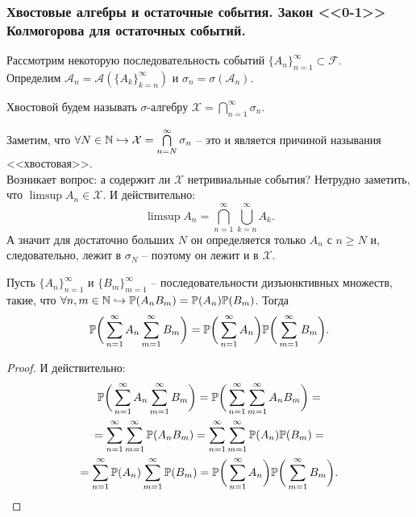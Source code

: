 \subsubsection{Хвостовые алгебры и остаточные события. Закон <<0-1>> Колмогорова для остаточных событий.}
Рассмотрим некоторую последовательность событий $\{A_n\}_{n = 1}^\infty \subset \mathcal{F}$. \\
Определим $\mathcal{A}_n = \mathcal{A}(\{A_k\}_{k = n}^\infty)$ и $\sigma_n = \sigma(\mathcal{A}_n)$. 
\begin{definition}
    Хвостовой будем называть $\sigma$-алгебру $\mathcal{X} = \bigcap\limits_{n = 1}^{\infty} \sigma_n$.    
\end{definition}
Заметим, что $\forall N \in \N \hookrightarrow \mathcal{X} = \bigcap\limits_{n = N}^\infty \sigma_n$ -- это и является причиной называния <<хвостовая>>. \\
Возникает вопрос: а содержит ли $\mathcal{X}$ нетривиальные события? Нетрудно заметить, что $\limsup A_n \in \mathcal{X}$. И действительно:
\[
    \limsup A_n = \bigcap\limits_{n = 1}^{\infty} \bigcup\limits_{k = n}^{\infty} A_k.
\]
А значит для достаточно больших $N$ он определяется только $A_n$ с $n \geq N$ и, следовательно, лежит в $\sigma_N$ -- поэтому он лежит и в $\mathcal{X}$. \\
\begin{lemma}
    Пусть $\{A_n\}_{n = 1}^\infty$ и $\{B_m\}_{m = 1}^{\infty}$ -- последовательности дизъюнктивных множеств, такие, что $\forall n, m \in \N \hookrightarrow \P(A_n B_m) = \P(A_n)\P(B_m)$. Тогда
    \[
        \P\biggr(\sum\limits_{n = 1}^\infty A_n \sum\limits_{m = 1}^\infty B_m\biggr) = \P\biggr(\sum\limits_{n = 1}^\infty A_n\biggr) \P\biggr(\sum\limits_{m = 1}^\infty B_m\biggr).
    \]
\end{lemma}
\begin{proof}
    И действительно:
    \begin{multline*}
        \P\biggr(\sum\limits_{n = 1}^\infty A_n \sum\limits_{m = 1}^\infty B_m\biggr) = \P\biggr(\sum\limits_{n = 1}^\infty \sum\limits_{m = 1}^\infty A_n B_m \biggr) = \\ = \sum\limits_{n = 1}^\infty \sum\limits_{m = 1}^{\infty}\P(A_n B_m) = \sum\limits_{n = 1}^{\infty}\sum\limits_{m = 1}^{\infty}\P(A_n)\P(B_m) =  \\ = \sum\limits_{n = 1}^{\infty}\P(A_n)\sum\limits_{m = 1}^{\infty} \P(B_m) = \P\biggr(\sum\limits_{n = 1}^\infty A_n\biggr)\P\biggr(\sum\limits_{m = 1}^\infty B_m\biggr).
    \end{multline*}
\end{proof}
